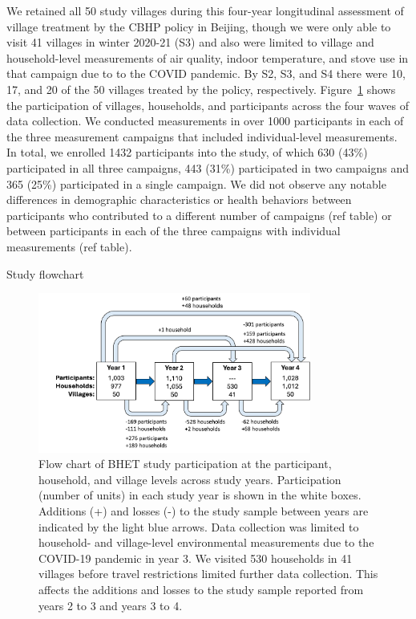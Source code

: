\documentclass[
  letterpaper,
  DIV=11,
  numbers=noendperiod]{scrartcl}
\begin{document}
We retained all 50 study villages during this four-year longitudinal
assessment of village treatment by the CBHP policy in Beijing, though we
were only able to visit 41 villages in winter 2020-21 (S3) and also were
limited to village and household-level measurements of air quality,
indoor temperature, and stove use in that campaign due to to the COVID
pandemic. By S2, S3, and S4 there were 10, 17, and 20 of the 50 villages
treated by the policy, respectively. Figure~\ref{fig-flowchart} shows
the participation of villages, households, and participants across the
four waves of data collection. We conducted measurements in over 1000
participants in each of the three measurement campaigns that included
individual-level measurements. In total, we enrolled 1432 participants
into the study, of which 630 (43\%) participated in all three campaigns,
443 (31\%) participated in two campaigns and 365 (25\%) participated in
a single campaign. We did not observe any notable differences in
demographic characteristics or health behaviors between participants who
contributed to a different number of campaigns (ref table) or between
participants in each of the three campaigns with individual measurements
(ref table).

Study flowchart

\begin{figure}[H]

{\centering \includegraphics[width=0.8\textwidth,height=\textheight]{images/participation-flow-chart-Mar18.png}

}

\caption{\label{fig-flowchart}Flow chart of BHET study participation at
the participant, household, and village levels across study years.
Participation (number of units) in each study year is shown in the white
boxes. Additions (+) and losses (-) to the study sample between years
are indicated by the light blue arrows. Data collection was limited to
household- and village-level environmental measurements due to the
COVID-19 pandemic in year 3. We visited 530 households in 41 villages
before travel restrictions limited further data collection. This affects
the additions and losses to the study sample reported from years 2 to 3
and years 3 to 4.}

\end{figure}
\end{document}
